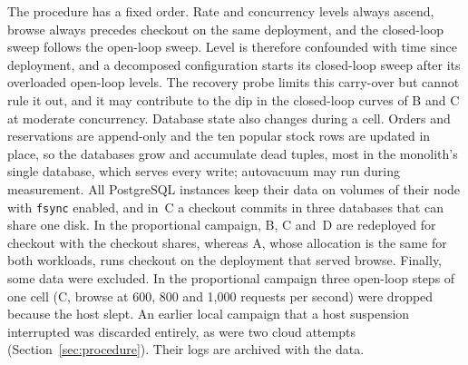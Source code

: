 The procedure has a fixed order. Rate and concurrency levels always ascend, browse always precedes checkout on the
same deployment, and the closed-loop sweep follows the open-loop sweep. Level is therefore confounded with time
since deployment, and a decomposed configuration starts its closed-loop sweep after its overloaded open-loop
levels. The recovery probe limits this carry-over but cannot rule it out, and it may contribute to the dip in the
closed-loop curves of B and C at moderate concurrency. Database state also changes during a cell. Orders and
reservations are append-only and the ten popular stock rows are updated in place, so the databases grow and
accumulate dead tuples, most in the monolith's single database, which serves every write; autovacuum may run
during measurement. All PostgreSQL instances keep their data on volumes of their node with \texttt{fsync} enabled,
and in~C a checkout commits in three databases that can share one disk. In the proportional campaign, B, C and~D
are redeployed for checkout with the checkout shares, whereas A, whose allocation is the same for both workloads,
runs checkout on the deployment that served browse. Finally, some data were excluded. In the proportional campaign
three open-loop steps of one cell (C, browse at 600, 800 and 1{,}000 requests per second) were dropped because the
host slept. An earlier local campaign that a host suspension interrupted was discarded entirely, as were two cloud attempts
(Section~\ref{sec:procedure}). Their logs are archived with the data.

